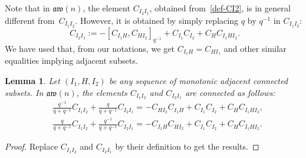 \documentclass[pdftex]{sigma}
\numberwithin{equation}{section}
\newtheorem{lemm}[theo]{Lemma}
\theoremstyle{definition}
\newcommand{\aw}{\mathfrak{aw}(n)}
\begin{document}
Note that in $\aw$, the element $C_{I_2I_1}$, obtained from~\eqref{def-CI2}, is in general different from~$C_{I_1I_2}$. However, it
is obtained by simply replacing $q$ by $q^{-1}$ in $C_{I_1I_2}$:
\begin{equation*}%
C_{I_2I_1}:=-[C_{I_1H},C_{HI_2}]_{q^{-1}}+{C_{I_1}C_{I_2}}+C_{H}C_{I_1HI_2}.
\end{equation*}
We have used that, from our notations, we get $C_{I_1H}=C_{HI_1}$ and other similar equalities implying adjacent subsets.

\begin{lemm} Let $(I_1,H,I_2)$ be any sequence of monotonic adjacent connected subsets. In $\aw$, the elements $C_{I_1I_2}$ and $C_{I_2I_1}$ are connected as follows:
\begin{subequations}\label{eq:C13C31}
\begin{align}
&\frac{q^{-1}}{q+q^{-1}}C_{I_1I_2} +\frac{q}{q+q^{-1}}C_{I_2I_1}= -C_{HI_2}C_{I_1H}+ C_{I_1}C_{I_2}+C_HC_{I_1HI_2},\\
& \frac{q}{q+q^{-1}}C_{I_1I_2}+\frac{q^{-1}}{q+q^{-1}}C_{I_2I_1}= -C_{I_1H}C_{HI_2}+ C_{I_1}C_{I_2}+C_HC_{I_1HI_2}.
\end{align}
\end{subequations}
\end{lemm}
\begin{proof} Replace $C_{I_1I_2}$ and $C_{I_2I_1}$ by their definition to get the results. \end{proof}
\end{document}
